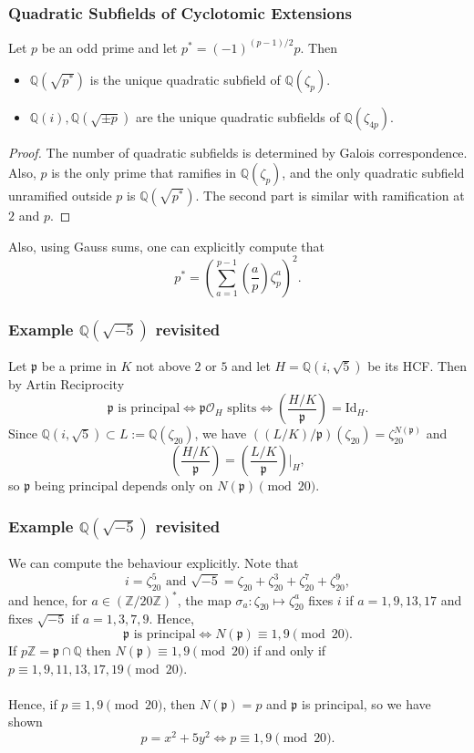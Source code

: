 \documentclass{beamer}
\newcommand{\QQ}{\mathbb{Q}}
\newcommand{\ZZ}{\mathbb{Z}}
\newcommand{\pp}{\mathfrak{p}}
\theoremstyle{plain}
\begin{document}
\begin{frame}
    \frametitle{Quadratic Subfields of Cyclotomic Extensions}
    \begin{lemma}
        Let $p$ be an odd prime and let $p^*=(-1)^{(p-1)/2}p$. Then
        \begin{itemize}
            \item $\QQ(\sqrt{p^*})$ is the unique quadratic subfield of $\QQ(\zeta_{p})$.
            \item $\QQ(i), \QQ(\sqrt{\pm p})$ are the unique quadratic subfields of $\QQ(\zeta_{4p})$.
        \end{itemize}
    \end{lemma}
    \begin{proof}
        The number of quadratic subfields is determined by Galois correspondence. Also, $p$ is the only prime that ramifies in $\QQ(\zeta_p)$, and the only quadratic subfield unramified outside $p$ is $\QQ(\sqrt{p^*})$. The second part is similar with ramification at $2$ and $p$.
    \end{proof}
    Also, using Gauss sums, one can explicitly compute that
    $$p^*=\left(\sum_{a=1}^{p-1}\left(\frac{a}{p}\right)\zeta_p^a\right)^2.$$
\end{frame}

\begin{frame}
    \frametitle{Example $\QQ(\sqrt{-5})$ revisited}
    Let $\pp$ be a prime in $K$ not above $2$ or $5$ and let $H=\QQ(i,\sqrt{5})$ be its HCF. Then by Artin Reciprocity
    $$\pp\text{ is principal}\iff\pp\mathcal{O}_H\text{ splits}\iff \left(\frac{H/K}{\pp}\right)=\mathrm{Id}_{H}.$$
    Since $\QQ(i,\sqrt{5})\subset L:=\QQ(\zeta_{20})$, we have $((L/K)/\pp)(\zeta_{20})=\zeta_{20}^{N(\pp)}$ and
    $$\left(\frac{H/K}{\pp}\right)=\left(\frac{L/K}{\pp}\right)\bigg|_H,$$
    so $\pp$ being principal depends only on $N(\pp)\pmod{20}$.

\end{frame}

\begin{frame}
    \frametitle{Example $\QQ(\sqrt{-5})$ revisited}
    We can compute the behaviour explicitly. Note that 
    $$i=\zeta_{20}^5\text{ and }\sqrt{-5}=\zeta_{20}+\zeta_{20}^3+\zeta_{20}^{7}+\zeta_{20}^{9},$$
    and hence, for $a\in(\ZZ/20\ZZ)^*$, the map $\sigma_a:\zeta_{20}\mapsto\zeta_{20}^a$ fixes $i$ if $a=1,9,13,17$ and fixes $\sqrt{-5}$ if $a=1,3,7,9$. Hence,
    $$\pp \text{ is principal}\iff N(\pp)\equiv1,9\pmod{20}.$$
    If $p\ZZ=\pp\cap\QQ$ then $N(\pp)\equiv1,9\pmod{20}$ if and only if $p\equiv 1,9,11,13,17,19\pmod{20}$. 
    \\~\\
    Hence, if $p\equiv 1,9\pmod{20}$, then $N(\pp)=p$ and $\pp$ is principal, so we have shown
    $$p=x^2+5y^2\iff p\equiv1,9\pmod{20}.$$
\end{frame}
\end{document}
